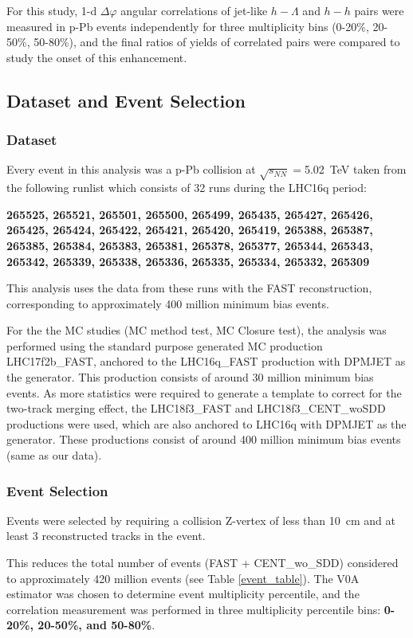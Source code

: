\documentclass[ALICE,manyauthors]{ALICE_analysis_notes}
\begin{document}
For this study, 1-d $\Delta\varphi$ angular correlations of jet-like $h-\Lambda$ and $h-h$ pairs were measured in p-Pb events independently for three multiplicity bins (0-20\%, 20-50\%, 50-80\%), and the final ratios of yields of correlated pairs were compared to study the onset of this enhancement. 


\subsection{Dataset and Event Selection}

\subsubsection{Dataset}

Every event in this analysis was a p-Pb collision at $\sqrt{s_{NN}} =$\SI{5.02}{TeV} taken from the following runlist which consists of 32 runs during the LHC16q period:

\textbf{265525, 265521, 265501, 265500, 265499, 265435, 265427, 265426, 265425, 265424, 265422, 265421, 265420, 265419, 265388, 265387, 265385, 265384, 265383, 265381, 265378, 265377, 265344, 265343, 265342, 265339, 265338, 265336, 265335, 265334, 265332, 265309}


This analysis uses the data from these runs with the FAST reconstruction, corresponding to approximately 400 million minimum bias events.

For the the MC studies (MC method test, MC Closure test), the analysis was performed using the standard purpose generated MC production LHC17f2b\_FAST, anchored to the LHC16q\_FAST production with DPMJET as the generator. This production consists of around 30 million minimum bias events. As more statistics were required to generate a template to correct for the two-track merging effect, the LHC18f3\_FAST and LHC18f3\_CENT\_woSDD productions were used, which are also anchored to LHC16q with DPMJET as the generator. These productions consist of around 400 million minimum bias events (same as our data).

\subsubsection{Event Selection}

Events were selected by requiring a collision Z-vertex of less than \SI{10}{cm} and at least 3 reconstructed tracks in the event.  

This reduces the total number of events (FAST + CENT\_wo\_SDD) considered to approximately 420 million events (see Table \ref{event_table}). The V0A estimator was chosen to determine event multiplicity percentile, and the correlation measurement was performed in three multiplicity percentile bins: \textbf{0-20\%, 20-50\%, and 50-80\%}.
\end{document}
